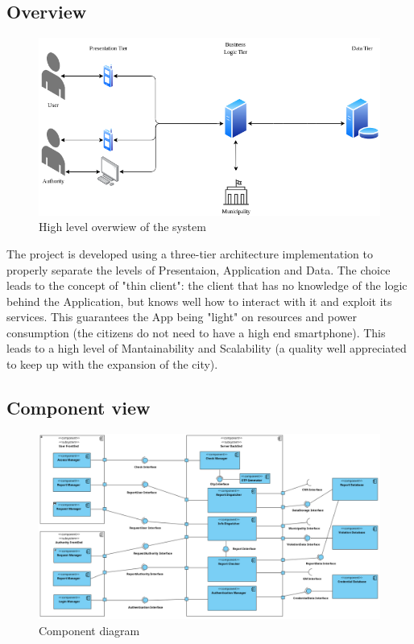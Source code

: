 \subsection{Overview}

    \begin{figure}[H]
        \includegraphics[width=\textwidth]{Images/SystemOverview.png}
        \caption{\label{fig:SystemOverview}High level overwiew of the system}
    \end{figure}

    The project is developed using a three-tier architecture implementation to properly separate the levels of Presentaion, Application and Data.
    The choice leads to the concept of "thin client": the client that has no knowledge of the logic behind the Application, but knows well how to interact with it 
    and exploit its services. This guarantees the App being "light" on resources and power consumption (the citizens do not need to have a high end smartphone).
    This leads to a high level of Mantainability and Scalability (a quality well appreciated to keep up with the expansion of the city).

\newpage

\subsection{Component view}

    \begin{figure}[H]
        \includegraphics[width=\textwidth]{Images/ComponentView.png}
        \caption{\label{fig:ComponentView}Component diagram}
    \end{figure}

